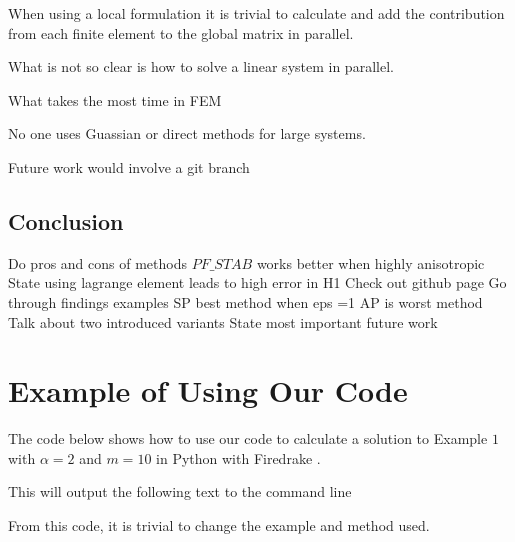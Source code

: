 \documentclass[12pt]{ociamthesis}
\begin{document}
When using a local formulation it is trivial to calculate and add the contribution from each finite element to the global matrix in parallel.

\begin{table}[] 
\caption{Comparison of solving linear system created by the data set thermal1 \cite{} using SciPy \cite{} GMRES $8$ Core CPU implementation  and CUDA CUSP \cite{} GMRES GPU implementation.}
\label{tbl_GPU}
\end{table} 

What is not so clear is how to solve a linear system in parallel. 

What takes the most time in FEM

No one uses Guassian or direct methods for large systems.

Future work would involve a git branch 

\section{Conclusion}
Do pros and cons of methods
$PF\_STAB$ works better when highly anisotropic
State using lagrange element leads to high error in H1
Check out github page \cite{Hub}
Go through findings examples SP best method when eps =1 AP is worst method 
Talk about two introduced variants 
State most important future work

\printbibliography[heading=bibintoc]

\appendix

\chapter{Example of Using Our Code}
The code below shows how to use our code to calculate a solution to Example $1$ with $\alpha=2$ and $m=10$ in Python with Firedrake \cite{Dragon}.

This will output the following text to the command line

From this code, it is trivial to change the example and method used.
\end{document}
